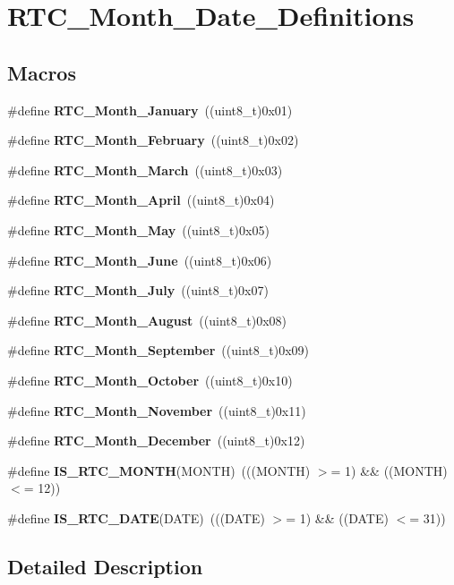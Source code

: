\section{R\+T\+C\+\_\+\+Month\+\_\+\+Date\+\_\+\+Definitions}
\label{group__RTC__Month__Date__Definitions}
\subsection*{Macros}
\begin{DoxyCompactItemize}
\item 
\#define \textbf{ R\+T\+C\+\_\+\+Month\+\_\+\+January}~((uint8\+\_\+t)0x01)
\item 
\#define \textbf{ R\+T\+C\+\_\+\+Month\+\_\+\+February}~((uint8\+\_\+t)0x02)
\item 
\#define \textbf{ R\+T\+C\+\_\+\+Month\+\_\+\+March}~((uint8\+\_\+t)0x03)
\item 
\#define \textbf{ R\+T\+C\+\_\+\+Month\+\_\+\+April}~((uint8\+\_\+t)0x04)
\item 
\#define \textbf{ R\+T\+C\+\_\+\+Month\+\_\+\+May}~((uint8\+\_\+t)0x05)
\item 
\#define \textbf{ R\+T\+C\+\_\+\+Month\+\_\+\+June}~((uint8\+\_\+t)0x06)
\item 
\#define \textbf{ R\+T\+C\+\_\+\+Month\+\_\+\+July}~((uint8\+\_\+t)0x07)
\item 
\#define \textbf{ R\+T\+C\+\_\+\+Month\+\_\+\+August}~((uint8\+\_\+t)0x08)
\item 
\#define \textbf{ R\+T\+C\+\_\+\+Month\+\_\+\+September}~((uint8\+\_\+t)0x09)
\item 
\#define \textbf{ R\+T\+C\+\_\+\+Month\+\_\+\+October}~((uint8\+\_\+t)0x10)
\item 
\#define \textbf{ R\+T\+C\+\_\+\+Month\+\_\+\+November}~((uint8\+\_\+t)0x11)
\item 
\#define \textbf{ R\+T\+C\+\_\+\+Month\+\_\+\+December}~((uint8\+\_\+t)0x12)
\item 
\#define \textbf{ I\+S\+\_\+\+R\+T\+C\+\_\+\+M\+O\+N\+TH}(M\+O\+N\+TH)~(((M\+O\+N\+TH) $>$= 1) \&\& ((M\+O\+N\+TH) $<$= 12))
\item 
\#define \textbf{ I\+S\+\_\+\+R\+T\+C\+\_\+\+D\+A\+TE}(D\+A\+TE)~(((D\+A\+TE) $>$= 1) \&\& ((D\+A\+TE) $<$= 31))
\end{DoxyCompactItemize}


\subsection{Detailed Description}


